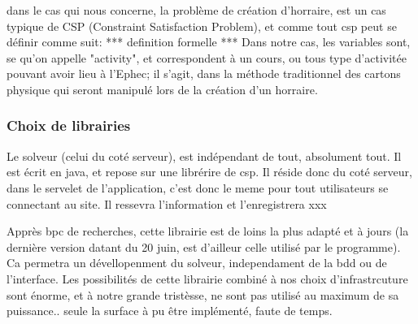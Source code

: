 dans le cas qui nous concerne, la problème de création d'horraire, est un cas typique de CSP (Constraint Satisfaction Problem), et comme tout csp peut se définir comme suit:
*** definition formelle ***
Dans notre cas, les variables sont, se qu'on appelle "activity", et correspondent à un cours, ou tous type d'activitée pouvant avoir lieu à l'Ephec; il s'agit, dans la méthode traditionnel des cartons physique qui seront manipulé lors de la création d'un horraire.




\subsubsection{Choix de librairies}
Le solveur (celui du coté serveur), est indépendant de tout, absolument tout. Il est écrit en java, et repose sur une librérire de csp. Il réside donc du coté serveur, dans le servelet de l'application, c'est donc le meme pour tout utilisateurs se connectant au  site. Il ressevra l'information et l'enregistrera xxx


Apprès bpc de recherches, cette librairie est de loins la plus adapté et à jours (la dernière version datant du 20 juin, est d'ailleur celle utilisé par le programme).  Ca permetra un dévellopenment du solveur, independament de la bdd ou de l'interface.
Les possibilités de cette librairie combiné à nos choix d'infrastrcuture sont énorme, et à notre grande tristèsse, ne sont pas utilisé au maximum de sa puissance..  seule la surface à pu être implémenté, faute de temps.

